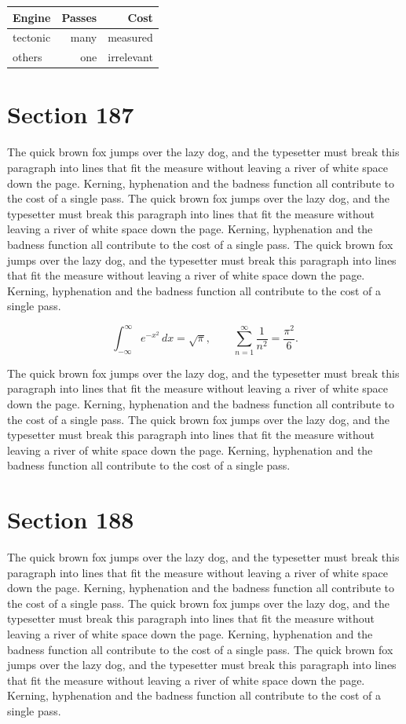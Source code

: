 \documentclass{article}
\begin{document}
\begin{center}
\begin{tabular}{lrr}
\toprule
Engine & Passes & Cost \\
\midrule
tectonic & many & measured \\
others & one & irrelevant \\
\bottomrule
\end{tabular}
\end{center}

\section{Section 187}
The quick brown fox jumps over the lazy dog, and the typesetter must break this paragraph into lines that fit the measure without leaving a river of white space down the page. Kerning, hyphenation and the badness function all contribute to the cost of a single pass. The quick brown fox jumps over the lazy dog, and the typesetter must break this paragraph into lines that fit the measure without leaving a river of white space down the page. Kerning, hyphenation and the badness function all contribute to the cost of a single pass. The quick brown fox jumps over the lazy dog, and the typesetter must break this paragraph into lines that fit the measure without leaving a river of white space down the page. Kerning, hyphenation and the badness function all contribute to the cost of a single pass. 

\begin{equation}
\int_{-\infty}^{\infty} e^{-x^{2}}\,dx = \sqrt{\pi}, \qquad
\sum_{n=1}^{\infty} \frac{1}{n^{2}} = \frac{\pi^{2}}{6}.
\end{equation}

The quick brown fox jumps over the lazy dog, and the typesetter must break this paragraph into lines that fit the measure without leaving a river of white space down the page. Kerning, hyphenation and the badness function all contribute to the cost of a single pass. The quick brown fox jumps over the lazy dog, and the typesetter must break this paragraph into lines that fit the measure without leaving a river of white space down the page. Kerning, hyphenation and the badness function all contribute to the cost of a single pass. 
\section{Section 188}
The quick brown fox jumps over the lazy dog, and the typesetter must break this paragraph into lines that fit the measure without leaving a river of white space down the page. Kerning, hyphenation and the badness function all contribute to the cost of a single pass. The quick brown fox jumps over the lazy dog, and the typesetter must break this paragraph into lines that fit the measure without leaving a river of white space down the page. Kerning, hyphenation and the badness function all contribute to the cost of a single pass. The quick brown fox jumps over the lazy dog, and the typesetter must break this paragraph into lines that fit the measure without leaving a river of white space down the page. Kerning, hyphenation and the badness function all contribute to the cost of a single pass. 
\end{document}
